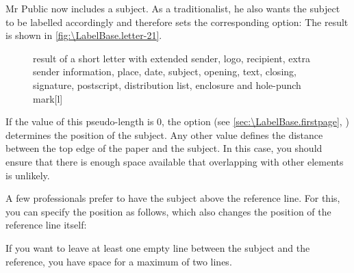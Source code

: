 \begin{Example}
  Mr Public now includes a subject. As a traditionalist, he also wants the
  subject to be labelled accordingly and therefore sets the corresponding
  option:%
  The result is shown in \autoref{fig:\LabelBase.letter-21}.
  \begin{figure}
    \setcapindent{0pt}%
    \begin{captionbeside}
      {result of a short letter with extended sender, logo, recipient,
        extra sender information, place, date, subject, opening, text,
        closing, signature, postscript, distribution list, enclosure and
        hole-punch mark}[l]
    \end{captionbeside}
    \label{fig:\LabelBase.letter-21}
  \end{figure}
\end{Example}
%
\EndIndexGroup


\begin{Declaration}
\end{Declaration}
%
If the value of this pseudo-length is 0, the
%
 option (see
\autoref{sec:\LabelBase.firstpage}, )
determines the position of the subject. Any other value defines the distance
between the top edge of the paper and the subject. In this
case, you should ensure that there is enough space available
that overlapping with other elements is unlikely.
\begin{Example}
  A few professionals prefer to have the subject above the reference line. For
  this, you can specify the position as follows, which also changes the
  position of the reference line itself:
  If you want to leave at least one empty line between the subject and the
  reference, you have space for a maximum of two lines.
\end{Example}
\EndIndexGroup


